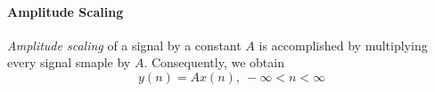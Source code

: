 \paragraph{Amplitude Scaling}\label{par:Amplitude Scaling}
\emph{Amplitude scaling} of a signal by a constant $A$ is accomplished by multiplying every signal smaple by $A$.
Consequently, we obtain
\begin{equation}\label{eq:Amplitude Scaling}
  y(n) = A x(n), \> -\infty < n < \infty
\end{equation}


